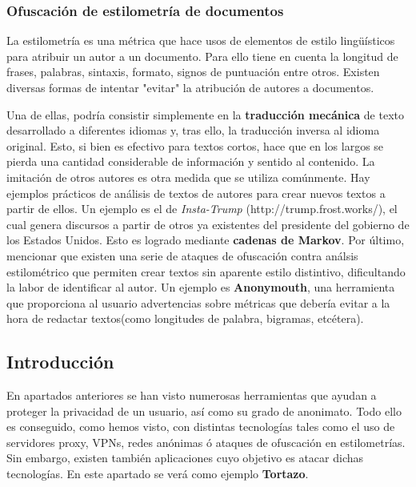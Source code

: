 \subsubsection{Ofuscación de estilometría de documentos}
 La estilometría
es una métrica que hace usos de elementos de estilo lingüísticos para
atribuir un autor a un documento. Para ello tiene en cuenta la
longitud de frases, palabras, sintaxis, formato, signos de puntuación
entre otros.  Existen diversas formas de intentar "evitar" la
atribución de autores a documentos.

Una de ellas, podría consistir simplemente en la \textbf{traducción
  mecánica} de texto desarrollado a diferentes idiomas y, tras ello,
la traducción inversa al idioma original. Esto, si bien es efectivo
para textos cortos, hace que en los largos se pierda una cantidad
considerable de información y sentido al contenido.  La imitación de
otros autores es otra medida que se utiliza comúnmente. Hay ejemplos
prácticos de análisis de textos de autores para crear nuevos textos a
partir de ellos. Un ejemplo es el de \textit{Insta-Trump}
(http://trump.frost.works/), el cual genera discursos a partir de
otros ya existentes del presidente del gobierno de los Estados
Unidos. Esto es logrado mediante \textbf{cadenas de Markov}.  Por
último, mencionar que existen una serie de ataques de ofuscación
contra análsis estilométrico que permiten crear textos sin aparente
estilo distintivo, dificultando la labor de identificar al autor.  Un
ejemplo es \textbf{Anonymouth}, una herramienta que proporciona al
usuario advertencias sobre métricas que debería evitar a la hora de
redactar textos(como longitudes de palabra, bigramas, etcétera).

 \label{sec:identificacion}
\subsection{Introducción}

En apartados anteriores se han visto numerosas herramientas que ayudan
a proteger la privacidad de un usuario, así como su grado de
anonimato. Todo ello es conseguido, como hemos visto, con distintas
tecnologías tales como el uso de servidores proxy, VPNs, redes
anónimas ó ataques de ofuscación en estilometrías.  Sin embargo,
existen también aplicaciones cuyo objetivo es atacar dichas
tecnologías. En este apartado se verá como ejemplo \textbf{Tortazo}.

